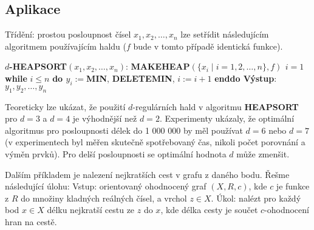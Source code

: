\documentclass[a4paper,12pt]{article}
\begin{document}
\subsection{
Aplikace 
}

Třídění: prostou posloupnost 
čísel $x_1,x_2,\dots,x_n$ lze setřídit následujícím 
algoritmem použí\-vajícím haldu ($f$ bude v tomto případě 
identická funkce).

$d${\bf -HEAPSORT$(x_1,x_2,\dots,x_n)$}:\newline 
{\bf MAKEHEAP$(\{x_i\mid i=1,2,\dots,n\},f)$\newline 
$i=1$\newline 
while} $i\le n$ {\bf do\newline 
\phantom{{\rm ---}}$y_i:=$MIN}, {\bf DELETEMIN}, $i:=i+1$\newline 
{\bf enddo\newline 
Výstup}: $y_1,y_2,\dots,y_n$

Teoreticky lze ukázat, že použití $d$-regulárních hald v 
algoritmu {\bf HEAPSORT} pro $d=3$ a $d=4$ je výhodnější 
než $d=2$. Experimenty ukázaly, že optimální 
algoritmus pro posloupnosti délek do 1 000 000 by měl  
používat $d=6$ nebo $d=7$ (v experimentech byl měřen 
skutečně spotřebovaný čas, nikoli počet porovnání a 
výměn prvků). 
Pro delší posloupnosti se optimální 
hodnota $d$ může zmenšit.

Dalším příkladem je nalezení nejkratších cest v grafu z daného 
bodu. \v Rešme následující úlohu: \newline 
Vstup: orientovaný ohodnocený graf $(X,R,c)$, kde $c$ je funkce z $
R$ do množiny kladných 
reálných čísel, a vrchol $z\in X$.\newline 
Úkol: nalézt pro každý bod $x\in X$ délku 
nejkratší cestu ze $z$ do $x$, kde délka cesty je součet 
$c$-ohodnocení hran na cestě.
\end{document}
